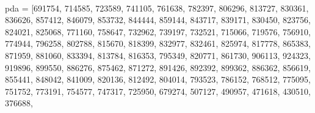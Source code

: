 \documentclass[a4paper,17pt]{extarticle}
\newenvironment{eleve}%
{\begin{activite}\color{noiramu}\\[-0.5cm]}
{\end{activite}}
\newenvironment{Shaded}{}{}
\newcommand{\DecValTok}[1]{\textcolor[rgb]{0.25,0.63,0.44}{{#1}}}
\newcommand{\NormalTok}[1]{{#1}}
\newcommand{\OperatorTok}[1]{\textcolor[rgb]{0.40,0.40,0.40}{{#1}}}
\begin{document}
\begin{eleve}
\begin{Shaded}
\begin{Highlighting}[]
\NormalTok{pda }\OperatorTok{=}\NormalTok{ [}\DecValTok{691754}\NormalTok{, }\DecValTok{714585}\NormalTok{, }\DecValTok{723589}\NormalTok{, }\DecValTok{741105}\NormalTok{, }\DecValTok{761638}\NormalTok{, }\DecValTok{782397}\NormalTok{, }\DecValTok{806296}\NormalTok{, }\DecValTok{813727}\NormalTok{, }\DecValTok{830361}\NormalTok{, }\DecValTok{836626}\NormalTok{,}
       \DecValTok{857412}\NormalTok{, }\DecValTok{846079}\NormalTok{, }\DecValTok{853732}\NormalTok{, }\DecValTok{844444}\NormalTok{, }\DecValTok{859144}\NormalTok{, }\DecValTok{843717}\NormalTok{, }\DecValTok{839171}\NormalTok{, }\DecValTok{830450}\NormalTok{, }\DecValTok{823756}\NormalTok{, }\DecValTok{824021}\NormalTok{, }
       \DecValTok{825068}\NormalTok{, }\DecValTok{771160}\NormalTok{, }\DecValTok{758647}\NormalTok{, }\DecValTok{732962}\NormalTok{, }\DecValTok{739197}\NormalTok{, }\DecValTok{732521}\NormalTok{, }\DecValTok{715066}\NormalTok{, }\DecValTok{719576}\NormalTok{, }\DecValTok{756910}\NormalTok{, }\DecValTok{774944}\NormalTok{, }
       \DecValTok{796258}\NormalTok{, }\DecValTok{802788}\NormalTok{, }\DecValTok{815670}\NormalTok{, }\DecValTok{818399}\NormalTok{, }\DecValTok{832977}\NormalTok{, }\DecValTok{832461}\NormalTok{, }\DecValTok{825974}\NormalTok{, }\DecValTok{817778}\NormalTok{, }\DecValTok{865383}\NormalTok{, }\DecValTok{871959}\NormalTok{, }
       \DecValTok{881060}\NormalTok{, }\DecValTok{833394}\NormalTok{, }\DecValTok{813784}\NormalTok{, }\DecValTok{816353}\NormalTok{, }\DecValTok{795349}\NormalTok{, }\DecValTok{820771}\NormalTok{, }\DecValTok{861730}\NormalTok{, }\DecValTok{906113}\NormalTok{, }\DecValTok{924323}\NormalTok{, }\DecValTok{919896}\NormalTok{, }
       \DecValTok{899550}\NormalTok{, }\DecValTok{886276}\NormalTok{, }\DecValTok{875462}\NormalTok{, }\DecValTok{871272}\NormalTok{, }\DecValTok{891426}\NormalTok{, }\DecValTok{892392}\NormalTok{, }\DecValTok{899362}\NormalTok{, }\DecValTok{886362}\NormalTok{, }\DecValTok{856619}\NormalTok{, }\DecValTok{855441}\NormalTok{, }
       \DecValTok{848042}\NormalTok{, }\DecValTok{841009}\NormalTok{, }\DecValTok{820136}\NormalTok{, }\DecValTok{812492}\NormalTok{, }\DecValTok{804014}\NormalTok{, }\DecValTok{793523}\NormalTok{, }\DecValTok{786152}\NormalTok{, }\DecValTok{768512}\NormalTok{, }\DecValTok{775095}\NormalTok{, }\DecValTok{751752}\NormalTok{, }
       \DecValTok{773191}\NormalTok{, }\DecValTok{754577}\NormalTok{, }\DecValTok{747317}\NormalTok{, }\DecValTok{725950}\NormalTok{, }\DecValTok{679274}\NormalTok{, }\DecValTok{507127}\NormalTok{, }\DecValTok{490957}\NormalTok{, }\DecValTok{471618}\NormalTok{, }\DecValTok{430510}\NormalTok{, }\DecValTok{376688}\NormalTok{, }

\end{Highlighting}
\end{Shaded}
\end{eleve}
\end{document}
